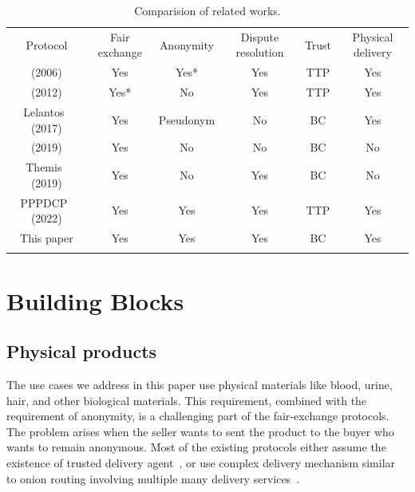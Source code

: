 \documentclass[pdftex,twocolumn,epjc3]{svjour3}
\begin{document}
{\begin{table}
\centering
\newcommand{\YES}{\cellcolor{green!50}Yes}
\newcommand{\YESBUT}{\cellcolor{green!25}Yes*}
\newcommand{\ID}{\cellcolor{green!25}Identity}
\newcommand{\PSEUDO}{\cellcolor{green!35}Pseudonym}
\newcommand{\ANON}{\cellcolor{green!50}Anonymity}
\newcommand{\NO}{\cellcolor{red!50}No}
\newcommand{\TTP}{\cellcolor{red!50}TTP}
\newcommand{\BC}{\cellcolor{green!50}BC}
\caption{Comparision of related works.}
\label{tab:comparision}
\setlength{\tabcolsep}{3pt}

\begin{tabular}{cccccc}

\noalign{\smallskip}\hline\noalign{\smallskip}
Protocol & Fair exchange & Anonymity & Dispute resolution & Trust & Physical delivery \\
\noalign{\smallskip}\hline\noalign{\smallskip}
\cite{zhangPracticalFairExchangeEPayment2006} (2006) & \YES & \YESBUT & \YES & \TTP & \YES \\
\cite{mohammedalarajFairnessPhysicalProducts2012} (2012) & \YESBUT & \NO & \YES & \TTP & \YES \\
Lelantos~\cite{altawyLelantosBlockchainBasedAnonymous2017} (2017) & \YES & \PSEUDO & \NO & \BC & \YES \\
\cite{hinarejosSolutionSecureCertified2019} (2019) & \YES & \NO & \NO & \BC & \NO \\
Themis~\cite{mengThemisDecentralizedEscrow2019} (2019) & \YES & \NO & \YES & \BC & \NO \\
PPPDCP~\cite{birjoveanuTwoPartyECommerceProtocols2022} (2022) & \YES & \YES & \YES & \TTP & \YES \\
This paper & \YES & \YES & \YES & \BC & \YES \\
\noalign{\smallskip}\hline

\end{tabular}

\end{table}
 
\section{Building Blocks}\label{sec:building-blocks}

\subsection{Physical products}\label{sec:physical-products}
The use cases we address in this paper use physical materials like blood, urine, hair, and other biological materials.
This requirement, combined with the requirement of anonymity, is a challenging part of the fair-exchange protocols. The problem arises when the seller wants to sent the product to the buyer who wants to remain anonymous. Most of the existing protocols either assume the existence of trusted delivery agent~\cite{mohammedalarajFairnessPhysicalProducts2012,birjoveanuAnonymityFairexchangeEcommerce2015}, or use complex delivery mechanism similar to onion routing involving multiple many delivery services~\cite{altawyLelantosBlockchainBasedAnonymous2017}. 

}
\end{document}
